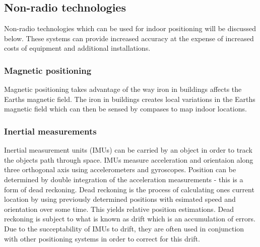 \documentclass[11pt,a4paper]{article}
\begin{document}
	\subsection{Non-radio technologies}
		Non-radio technologies which can be used for indoor positioning will be discussed below. These systems can provide increased accuracy at the expense of increased costs of equipment and additional installations.
	
	\subsubsection{Magnetic positioning}
		Magnetic positioning takes advantage of the way iron in buildings affects the Earths magnetic field. The iron in buildings creates local variations in the Earths magnetic field which can then be sensed by compases to map indoor locations.
		\cite{supreeth_sudhakaran_geospatial_2014}
	
	\subsubsection{Inertial measurements}
		Inertial measurement units (IMUs) can be carried by an object in order to track the objects path through space. IMUs measure acceleration and orientaion along three orthogonal axis using accelerometers and gyroscopes. Position can be determined by double integration of the acceleration measurements - this is a form of dead reckoning. Dead reckoning is the process of calculating ones current location by using previously determined positions with esimated speed and orientation over some time. This yields relative position estimations. Dead reckoning is subject to what is known as drift which is an accumulation of errors. Due to the succeptability of IMUs to drift, they are often used in conjunction with other positioning systems in order to correct for this drift.

\newpage
\printbibliography
\end{document}
